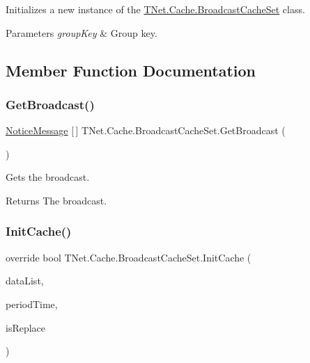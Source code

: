 Initializes a new instance of the \mbox{\hyperlink{class_t_net_1_1_cache_1_1_broadcast_cache_set}{T\+Net.\+Cache.\+Broadcast\+Cache\+Set}} class. 


\begin{DoxyParams}{Parameters}
{\em group\+Key} & Group key.\\
\hline
\end{DoxyParams}


\subsection{Member Function Documentation}
\mbox{\label{class_t_net_1_1_cache_1_1_broadcast_cache_set_a10d801f1dec26e2b94647299014dd9a1}} 
\subsubsection{\texorpdfstring{Get\+Broadcast()}{GetBroadcast()}}
{\footnotesize\ttfamily \mbox{\hyperlink{class_t_net_1_1_message_1_1_notice_message}{Notice\+Message}} \mbox{[}$\,$\mbox{]} T\+Net.\+Cache.\+Broadcast\+Cache\+Set.\+Get\+Broadcast (\begin{DoxyParamCaption}{ }\end{DoxyParamCaption})}



Gets the broadcast. 

\begin{DoxyReturn}{Returns}
The broadcast.
\end{DoxyReturn}
\mbox{\label{class_t_net_1_1_cache_1_1_broadcast_cache_set_ab9fe3d2e0e4ddd44f86355831301cc84}} 
\subsubsection{\texorpdfstring{Init\+Cache()}{InitCache()}}
{\footnotesize\ttfamily override bool T\+Net.\+Cache.\+Broadcast\+Cache\+Set.\+Init\+Cache (\begin{DoxyParamCaption}\item[{List$<$ \mbox{\hyperlink{class_t_net_1_1_message_1_1_notice_message}{Notice\+Message}} $>$}]{data\+List,  }\item[{int}]{period\+Time,  }\item[{bool}]{is\+Replace }\end{DoxyParamCaption})\hspace{0.3cm}{\ttfamily [protected]}}






